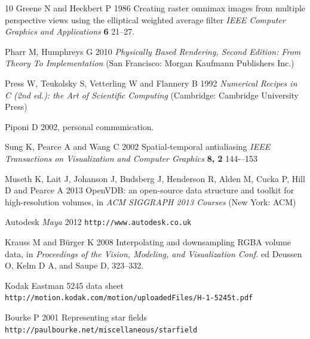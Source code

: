 \documentclass[12pt]{iopart}
\begin{document}
\begin{thebibliography}{10}
Greene N and Heckbert P 1986 Creating raster omnimax images from multiple perspective
views using the elliptical weighted average filter {\it IEEE Computer Graphics and
Applications} {\bf 6} 21--27.

Pharr M, Humphreys G 2010 {\it Physically Based Rendering, Second Edition: From Theory To Implementation} 
(San Francisco: Morgan Kaufmann Publishers Inc.)

Press W, Teukolsky S, Vetterling W and Flannery B 1992 {\it Numerical Recipes in C (2nd ed.): the Art of Scientific Computing}
(Cambridge: Cambridge University Press)

Piponi D 2002, personal communication.

Sung K, Pearce A and Wang C 2002 Spatial-temporal antialiasing {\it IEEE Transactions on Visualization and Computer Graphics}
{\bf 8, 2}  144-–153

Museth K, Lait J, Johanson J, Budsberg J, Henderson R, Alden M, Cucka P, Hill D and Pearce A
2013 OpenVDB: an open-source data structure and toolkit for high-resolution volumes,
in {\it ACM SIGGRAPH 2013 Courses} (New York: ACM)

Autodesk {\it Maya} 2012 \verb"http://www.autodesk.co.uk"

 Krauss M and B{\"u}rger K 2008 Interpolating and downsampling RGBA volume data, in \emph{Proceedings of the Vision, Modeling, and Visualization Conf.} ed Deussen O, Kelm D A, and Saupe D, 323--332.   


 Kodak Eastman 5245 data sheet  \verb"http://motion.kodak.com/motion/uploadedFiles/H-1-5245t.pdf"

 Bourke P 2001 Representing star fields \verb"http://paulbourke.net/miscellaneous/starfield"
\end{thebibliography}
\end{document}
